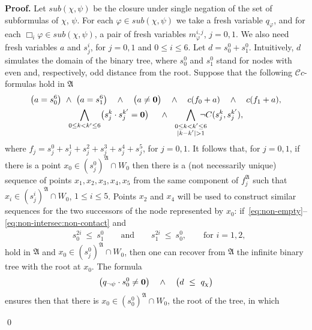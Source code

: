 \documentclass{LMCS}
\renewenvironment{proof}{\par\noindent\textbf{Proof.}}{\mbox{}\qed\par\medskip}
\theoremstyle{plain}
\newcommand{\cBC}{\ensuremath{\mathcal{C}}}
\newcommand{\cBCc}{\ensuremath{\cBC{}c}} \newcommand{\cBCcc}{\ensuremath{\cBC{}cc}}
\begin{document}
\begin{proof}
Let $\textit{sub}(\chi,\psi)$ be the closure under single negation of
the set of subformulas of $\chi$, $\psi$. For each $\varphi \in
\textit{sub}(\chi,\psi)$ we take a fresh variable $q_{\varphi}$, and
for each $\Box_{i}\varphi \in \mathit{sub}(\chi,\psi)$, a pair of
fresh variables $m_{\varphi}^{i,j}$,  $j=0,1$. We
also need fresh variables $a$ and $s_j^{i}$, for $j = 0,1$ and $0 \leq i \leq
6$. Let $d = s_{0}^{0}+s_{1}^{0}$.  Intuitively, $d$ simulates the
domain of the binary tree, where $s_{0}^{0}$ and $s_{1}^{0}$ stand for
nodes with even and, respectively, odd distance from the root. Suppose
that the following $\cBCc$-formulas hold in $\mathfrak{A}$
\begin{gather}
\label{eq:non-empty}
\bigl(a = s_0^6\bigr)  \ \land \ \bigl(a = s_1^6\bigr) \quad\land\quad \bigl(a \ne \zero\bigr)
\quad \land \quad c(f_0 + a) \quad \land \quad c(f_1 + a),\\
\label{eq:non-intersec:non-contact}
\bigwedge_{0 \leq k < k' \le 6} \bigl(s_j^k \cdot s_j^{k'} = \zero\bigr) \ \ \ \ \land \ \ \bigwedge_{\begin{subarray}{c}0 \leq k < k' \leq 6\\ |k - k'|>1\end{subarray}}  \hspace*{-1em}\neg C(s_j^k,s_j^{k'}),\end{gather}
where $f_j = s_j^0 + s_j^1 + s_j^2 + s_j^3 + s_j^4 + s_j^5$, for  $j=0,1$.
It follows that, for $j = 0,1$, if there is a point $x_0\in (s_j^0)^\mathfrak{A} \cap W_0$ then there is a (not necessarily unique) sequence of points $x_1,x_2,x_3,x_4,x_5$ from the same component of $f_j^\mathfrak{A}$ such that $x_i\in (s_j^i)^\mathfrak{A} \cap W_0$, $1 \leq i \leq 5$. Points $x_2$ and $x_4$ will be used to construct similar sequences for the two successors of the node represented by $x_0$:
if~\eqref{eq:non-empty}--\eqref{eq:non-intersec:non-contact} and
\begin{align}
\label{eq:init}
& s_0^{2i} ~\le~ s_1^0\qquad\text{and}\qquad s_1^{2i} ~\le~ s_0^0,\qquad \text{for } i=1,2,\end{align}
hold in $\mathfrak{A}$ and $x_0 \in (s_j^0)^\mathfrak{A} \cap W_0$, then one can recover from $\mathfrak{A}$ the infinite binary tree with the root at $x_0$. The formula
\begin{align}\label{1}
\bigl(q_{\neg\psi} \cdot s^0_0 \ne \mathbf{0}\bigr) \quad \land\quad  \bigl(d ~\le~ q_\chi\bigr)
\end{align}
ensures then that there is $x_0 \in (s_0^0)^\mathfrak{A} \cap W_0$, the root of the tree, in which

\end{proof}
\end{document}
